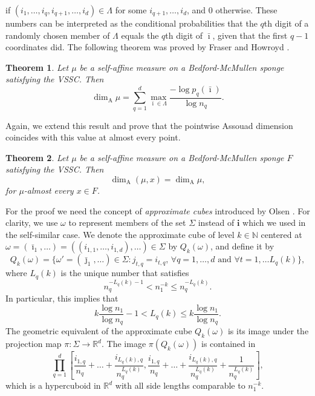 \documentclass{PRM}
\newcommand{\field}[1]{\mathbb{#1}}
\newcommand{\N}{\field{N}}
\newcommand{\R}{\field{R}}
\theoremstyle{plain}
\newtheorem{thm}{Theorem}[section]
\theoremstyle{definition}
\theoremstyle{remark}
\begin{document}
if $(i_1,\ldots,i_q,i_{q+1},\ldots,i_d)\in\Lambda$ for some $i_{q+1},\ldots,i_d$, and 0 otherwise. These numbers can be interpreted as the conditional probabilities that the $q$th digit of a randomly chosen member of $\Lambda$ equals the $q$th digit of $\bar{\imath}$, given that the first $q-1$ coordinates did. The following theorem was proved by Fraser and Howroyd \cite[Theorem 2.6]{FH}.

\begin{thm}\label{thm:bm_formula}
Let $\mu$ be a self-affine measure on a Bedford-McMullen sponge satisfying the VSSC. Then
\begin{equation*}
    \dim_{\mathrm{A}}\mu=\sum_{q=1}^d\max_{\bar{\imath}\in \Lambda}\frac{-\log p_q(\bar{\imath})}{\log n_q}.
\end{equation*}
\end{thm}
Again, we extend this result and prove that the pointwise Assouad dimension coincides with this value at almost every point.

\begin{thm}\label{thm:bm_exact_dimensionality}
Let $\mu$ be a self-affine measure on a Bedford-McMullen sponge $F$ satisfying the VSSC. Then
\begin{equation*}
    \dim_{\mathrm{A}}(\mu,x)=\dim_{\mathrm{A}}\mu,
\end{equation*}
for $\mu$-almost every $x\in F$.
\end{thm}
For the proof we need the concept of \emph{approximate cubes} introduced by Olsen \cite{O}. For clarity, we use $\omega$ to represent members of the set $\Sigma$ instead of $\mathbf{i}$ which we used in the self-similar case. We denote the approximate cube of level $k\in\N$ centered at $\omega=(\bar{\imath}_1,\ldots)=((i_{1,1},\ldots,i_{1,d}),\ldots)\in\Sigma$ by $Q_k(\omega)$, and define it by
\begin{equation*}
    Q_k(\omega)=\{\omega'=(\bar{\jmath}_1,\ldots)\in\Sigma\colon j_{t,q}=i_{t,q},\,\forall q=1,\ldots,d\text{ and }\forall t=1,\ldots L_q(k)\},
\end{equation*}
where $L_q(k)$ is the unique number that satisfies
\begin{equation*}
   n_q^{-L_q(k)-1} <n_1^{-k}\leq n_q^{-L_q(k)}.
\end{equation*}
In particular, this implies that
\begin{equation*}
    k\frac{\log n_1}{\log n_q}-1< L_q(k)\leq k\frac{\log n_1}{\log n_q}.
\end{equation*}
The geometric equivalent of the approximate cube $Q_k(\omega)$ is its image under the projection map $\pi:\Sigma\to \R^d$. The image $\pi(Q_k(\omega))$ is contained in
\begin{equation*}
    \prod_{q=1}^d\left[\frac{i_{1,q}}{n_q}+\ldots+\frac{i_{L_q(k),q}}{n_q^{L_q(k)}},\frac{i_{1,q}}{n_q}+\ldots+\frac{i_{L_q(k),q}}{n_q^{L_q(k)}}+\frac{1}{n_q^{L_q(k)}}\right],
\end{equation*}
which is a hypercuboid in $\R^d$ with all side lengths comparable to $n_1^{-k}$.
\end{document}
